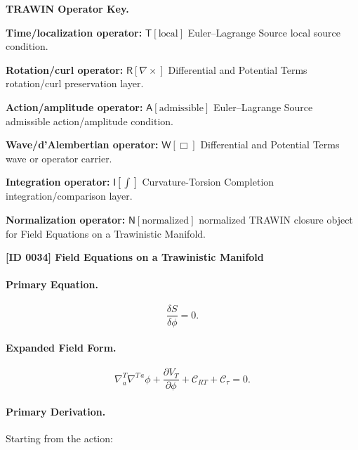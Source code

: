 \par\vspace{0.45\baselineskip}
\noindent\begin{minipage}[t]{\linewidth}
\begingroup
\small
\raggedright
\textbf{TRAWIN Operator Key.}\par
\noindent\textbf{Time/localization operator:} $\mathsf{T}\!\left[\mathrm{local}\right]$ Euler--Lagrange Source local source condition.\par
\noindent\textbf{Rotation/curl operator:} $\mathsf{R}\!\left[\nabla\times\right]$ Differential and Potential Terms rotation/curl preservation layer.\par
\noindent\textbf{Action/amplitude operator:} $\mathsf{A}\!\left[\mathrm{admissible}\right]$ Euler--Lagrange Source admissible action/amplitude condition.\par
\noindent\textbf{Wave/d'Alembertian operator:} $\mathsf{W}\!\left[\Box\right]$ Differential and Potential Terms wave or operator carrier.\par
\noindent\textbf{Integration operator:} $\mathsf{I}\!\left[\int\right]$ Curvature-Torsion Completion integration/comparison layer.\par
\noindent\textbf{Normalization operator:} $\mathsf{N}\!\left[\mathrm{normalized}\right]$ normalized TRAWIN closure object for Field Equations on a Trawinistic Manifold.\par
\endgroup
\end{minipage}

\clearpage
\noindent\textbf{[ID 0034] Field Equations on a Trawinistic Manifold}\par
\vspace{0.35em}
\paragraph{Primary Equation.}
\begin{equation}
\frac{\delta S}{\delta \phi}=0 .
\end{equation}

\paragraph{Expanded Field Form.}
\begin{equation}
\nabla^T_a\nabla^{T\,a}\phi
+
\frac{\partial V_T}{\partial \phi}
+
\mathcal{C}_{RT}
+
\mathcal{C}_{\tau}
=
0 .
\end{equation}

\paragraph{Primary Derivation.}
Starting from the action:

